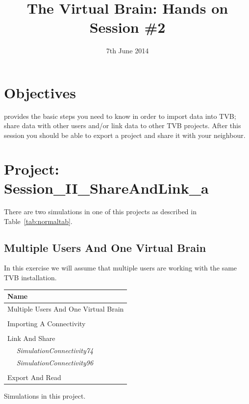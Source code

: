 \documentclass{tufte-handout}
\title{The Virtual Brain: Hands on Session \#2}
\date{7th June 2014}
\begin{document}

\newpage
\ClearWallPaper

\section{Objectives}\label{sec:objectives}

 provides the basic steps you need to know in order to import data into TVB; share data with other users and/or link data to other TVB projects.
After this session you should be able to export a project and share it with your neighbour. 

\section{Project: Session\_II\_ShareAndLink\_a}\label{sec:project_data}

There are two simulations in one of this projects as described in Table~\ref{tab:normaltab}. 

\subsection{Multiple Users And One Virtual Brain}\label{sec:multiusers}
In this exercise we will assume that multiple users are working with the same TVB installation. 

\begin{margintable}
  \centering
  \selectfont
  \begin{tabular}{l}
    \toprule
    Name \\
    \midrule
    \multicolumn{1}{l}{Multiple Users And One Virtual Brain}\\
    \\
    \multicolumn{1}{l}{Importing A Connectivity}\\
    \\
    \multicolumn{1}{l}{Link And Share}\\
    $\quad$ \textit{SimulationConnectivity74} \\
    $\quad$ \textit{SimulationConnectivity96} \\
    \\
    \multicolumn{1}{l}{Export And Read}\\
    \bottomrule
  \end{tabular}
  \caption{Simulations in this project.}
  \label{tab:normaltab}
\end{margintable}
\end{document}
